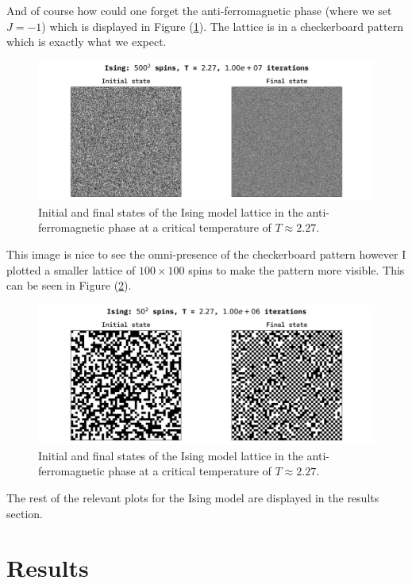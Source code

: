 \documentclass[10pt, titlepage, a4paper]{article}
\begin{document}
And of course how could one forget the anti-ferromagnetic phase (where we set $J=-1$) which is displayed in Figure (\ref{fig:ising-demo-anti}).
The lattice is in a checkerboard pattern which is exactly what we expect.

\begin{figure}[H]
    \centering
    \includegraphics[width=.95\textwidth]{../IsingModel/Images/ising-anti-critical.png}
    \caption{Initial and final states of the Ising model lattice in the anti-ferromagnetic phase at a critical temperature of $T\approx 2.27$.}
    \label{fig:ising-demo-anti}
\end{figure}

This image is nice to see the omni-presence of the checkerboard pattern however I plotted a smaller lattice of $100\times 100$ spins 
to make the pattern more visible. This can be seen in Figure (\ref{fig:ising-demo-anti-small}).

\begin{figure}
    \centering
    \includegraphics[width=.95\textwidth]{../IsingModel/Images/ising-anti-zoom-critical.png}
    \caption{Initial and final states of the Ising model lattice in the anti-ferromagnetic phase at a critical temperature of $T\approx 2.27$.}
    \label{fig:ising-demo-anti-small}
\end{figure}


The rest of the relevant plots for the Ising model are displayed in the results section.

\section{Results}
\end{document}
